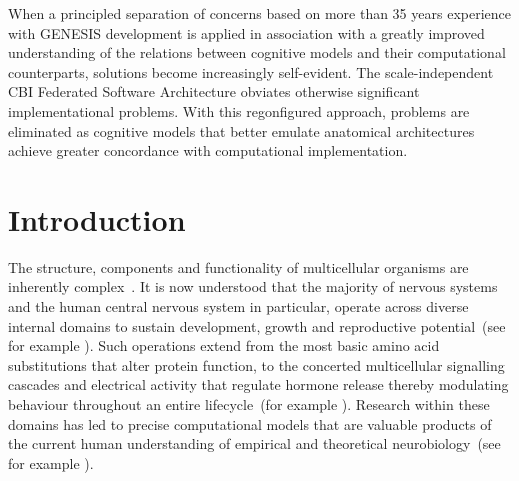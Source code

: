 \documentclass[10pt,letterpaper]{article}
\begin{document}
When a principled separation of concerns based on more than 35 years experience with GENESIS development is applied in association with a greatly improved understanding of the relations between cognitive models and their computational counterparts, solutions become increasingly self-evident. The scale-independent CBI Federated Software Architecture obviates otherwise significant implementational problems. With this regonfigured approach, problems are eliminated as cognitive models that better emulate anatomical architectures achieve greater concordance with computational implementation.


\linenumbers


\section*{Introduction}

The structure, components and functionality of multicellular organisms are inherently complex~\cite{walpole13}. It is now understood that the majority of nervous systems and the human central nervous system in particular, operate across diverse internal domains to sustain development, growth and reproductive potential~(see for example \cite{selverston87,vonk22,kandel21}). Such operations extend from the most basic amino acid substitutions that alter protein function, to the concerted multicellular signalling cascades and electrical activity that regulate hormone release thereby modulating behaviour throughout an entire lifecycle~(for example \cite{ejn17}). Research within these domains has led to precise computational models that are valuable products of the current human understanding of empirical and theoretical neurobiology~(see for example \cite{bower13,nandi22}). 
\end{document}
